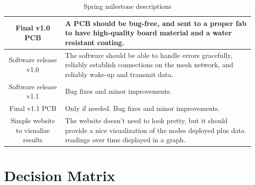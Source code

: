 \documentclass{article}
\begin{document}
\begin{table}[H]
\begin{tabularx}{\linewidth}{|c|X|}
        \hline
        Final v1.0 PCB
        & A PCB should be bug-free, and sent to a proper fab to have high-quality board material and a water resistant coating.
        \\
        
        \hline
        Software release v1.0
        & The software should be able to handle errors gracefully, reliably establish connections on the mesh network, and reliably wake-up and transmit data.
        \\ 
        
        \hline
        Software release v1.1
        & Bug fixes and minor improvements.
        \\ 
        
        \hline
        Final v1.1 PCB
        & Only if needed. Bug fixes and minor improvements.
        \\
        
        \hline
        Simple website to visualize results
        & The website doesn't need to look pretty, but it should provide a nice visualization of the nodes deployed plus data readings over time displayed in a graph.
        \\
        
        \hline
    \end{tabularx}
    \caption{Spring milestone descriptions}
\end{table}

\section{Decision Matrix}
\end{document}
